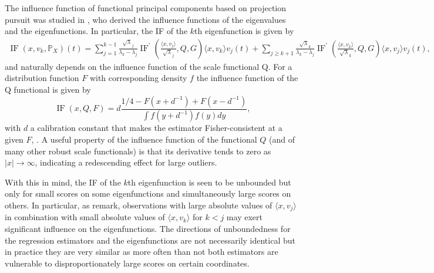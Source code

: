 \documentclass[11pt]{article}
\DeclareMathOperator{\IF}{IF}
\begin{document}
The influence function of functional principal components based on projection pursuit was studied in \cite{bali2015influence}, who derived the influence functions of the eigenvalues and the eigenfunctions. In particular, the  IF of the $k$th eigenfunction is given by
\small
\begin{align}
\IF\left(x, v_k, \mathbb{P}_X \right)(t)  =  \sum_{j=1}^{k-1} \frac{\sqrt{\lambda}_j}{\lambda_k - \lambda_j} \IF^{\prime}\left( \frac{\langle x, v_j \rangle}{\sqrt{\lambda}_j}, Q, G \right) \langle x, v_k \rangle v_j(t) + \sum_{j\geq k+1} \frac{\sqrt{\lambda}_k}{\lambda_k - \lambda_j}\IF^{\prime}\left( \frac{\langle x, v_k \rangle}{\sqrt{\lambda}_k}, Q, G \right)  \langle x, v_j \rangle v_j(t),
\end{align}
\normalsize
and naturally depends on the influence function of the scale functional Q. For a distribution function $F$ with corresponding density $f$ the influence function of the Q functional is given by
\begin{equation}
\IF\left(x, Q, F \right) = d\frac{1/4-F(x+d^{-1}) + F(x-d^{-1})}{\int f(y+d^{-1})f(y) dy},
\end{equation}
with $d$ a calibration constant that makes the estimator Fisher-consistent at a given $F$, \citep{rousseeuw1993alternatives}. A useful property of the influence function of the functional $Q$  (and of many other robust scale functionals) is that its derivative tends to zero as $|x| \to \infty$, indicating a redescending effect for large outliers. 

With this in mind, the IF of the $k$th eigenfunction is seen to be unbounded but only for small scores on some eigenfunctions and simultaneously large scores on others. In particular, as \cite{bali2015influence} remark, observations with large absolute values of $\langle x, v_j \rangle$ in combination with small absolute values of $\langle x, v_k \rangle$ for $k<j$ 
may exert significant influence on the eigenfunctions.  The directions of unboundedness for the regression estimators and the  eigenfunctions are not necessarily identical but in practice they are very similar as more often than not both estimators are vulnerable to disproportionately large scores on certain coordinates. 
\end{document}
